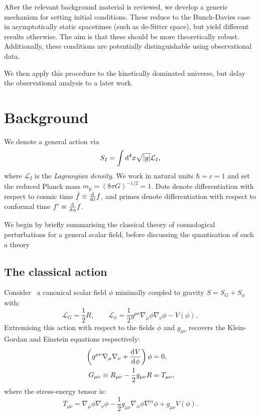 After the relevant background material is reviewed, we develop a generic mechanism for setting initial conditions. These reduce to the Bunch-Davies case in asymptotically static spacetimes (such as de-Sitter space), but yield different results otherwise. The aim is that these should be more theoretically robust. Additionally, these conditions are potentially distinguishable using observational data.

We then apply this procedure to the kinetically dominated universe, but delay the observational analysis to a later work.



\section{Background}
\label{sec:background}

\clearpage{}

We denote a general action via
\begin{equation}
  S_I = \int \d[4]{x}\sqrt{|g|}\mathcal{L}_I,
  \label{eqn:general_action}
\end{equation}
where $\mathcal{L}_I$ is the {\em Lagrangian density}. We work in natural units $\hbar=c=1$ and set the reduced Planck mass $m_\mathrm{p} = {(8\pi G)}^{-1/2} = 1$. Dots denote differentiation with respect to cosmic time $\dot{f}\equiv \frac{\operatorname{d}^{}\!{}}{\operatorname{d}^{}\!{t}}f$, and primes denote differentiation with respect to conformal time ${{f}^\prime}\equiv\frac{\operatorname{d}^{}\!{}}{\operatorname{d}^{}\!{\eta}}f$.

We begin by briefly summarising the classical theory of cosmological perturbations for a general scalar field, before discussing the quantisation of such a theory


\subsection{The classical action}
\label{sec:inflation}
Consider~\cite{Baumann+2009} a canonical scalar field $\phi$ minimally coupled to gravity $S= S_G + S_\phi$ with:
\begin{equation}
  \mathcal{L}_G = \frac{1}{2}R, 
  \qquad
  \mathcal{L}_\phi = \frac{1}{2}g^{\mu\nu}\nabla_\mu\phi\nabla_\nu\phi - V(\phi),
  \label{eqn:action}
\end{equation}
Extremising this action with respect to the fields $\phi$ and $g_{\mu\nu}$ recovers the Klein-Gordan and Einstein equations respectively:
\begin{align}
  \left( g^{\mu\nu}\nabla_\mu\nabla_\nu + \frac{\d{V}}{\d{\phi}} \right) \phi &= 0,
  \label{eqn:klein_gordon}\\
  G_{\mu\nu}\equiv R_{\mu\nu}-\frac{1}{2}g_{\mu\nu}R&= T_{\mu\nu},
  \label{eqn:einstein}
\end{align}
where the stress-energy tensor is:
\begin{equation}
  T_{\mu\nu} = \nabla_\mu\phi \nabla_\nu\phi - \frac{1}{2}g_{\mu\nu} \nabla_\alpha\phi \nabla^\alpha\phi +g_{\mu\nu} V(\phi).
  \label{eqn:SET}
\end{equation}

